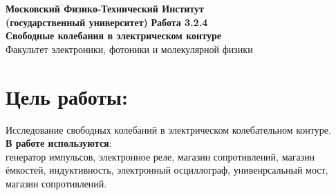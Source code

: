 \documentclass[11pt]{article}
\begin{document}
\begin{titlepage}
\begin{center}
\large\textbf{Московский Физико-Технический Институт}\\
\large\textbf{(государственный университет)}
\vfill
\huge\textbf{ Работа 3.2.4}\\
\huge\textbf{Свободные колебания в электрическом контуре}\\
\vfill
\large Факультет электроники, фотоники и молекулярной физики\\
\end{center}
\end{titlepage}
\tableofcontents
\newpage
\section{Цель работы:}
Исследование свободных колебаний в электрическом колебательном контуре.\\
\textbf{В работе используются}:\\ генератор импульсов, электронное реле, магазин сопротивлений, магазин ёмкостей, индуктивность, электронный осциллограф, унивенрсальный мост, магазин сопротивлений.
\end{document}
